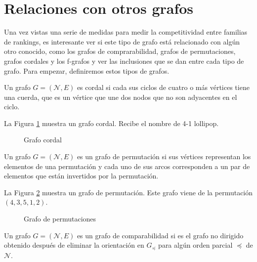 \section{Relaciones con otros grafos}

Una vez vistas una serie de medidas para medir la competitividad entre familias de rankings, es interesante ver si este tipo de grafo está relacionado con algún otro conocido, como los grafos de comprarabilidad, grafos de permutaciones, grafos cordales y los f-grafos y ver las inclusiones que se dan entre cada tipo de grafo. Para empezar, definiremos estos tipos de grafos.

\begin{defi}
Un grafo $G = (\mathcal{N}, E)$ es cordal si cada sus ciclos de cuatro o más vértices tiene una cuerda, que es un vértice que une dos nodos que no son adyacentes en el ciclo.
\end{defi} 

\begin{ejemplo}
La Figura \ref{fig:grafo_cordal} muestra un grafo cordal. Recibe el nombre de 4-1 lollipop.

\begin{figure}[htb]
\centering
\ejemplografocordal
\caption{Grafo cordal}
\label{fig:grafo_cordal}
\end{figure}
\end{ejemplo}

\begin{defi}
Un grafo $G = (\mathcal{N}, E)$ es un grafo de permutación si sus vértices representan los elementos de una permutación y cada uno de sus arcos corresponden a un par de elementos que están invertidos por la permutación.
\end{defi}

\begin{ejemplo}
La Figura \ref{fig:grafo_permutación} muestra un grafo de permutación. Este grafo viene de la permutación $(4,3,5,1,2)$.  

\begin{figure}[htb]
\centering
\ejemplografopermutacion
\caption{Grafo de permutaciones}
\label{fig:grafo_permutación}
\end{figure}
\end{ejemplo}

\begin{defi}
Un grafo $G = (\mathcal{N}, E)$ es un grafo de comparabilidad si es el grafo no dirigido obtenido después de eliminar la orientación en $G_\preceq$ para algún orden parcial $\preceq$ de $\mathcal{N}$.  
\end{defi}


